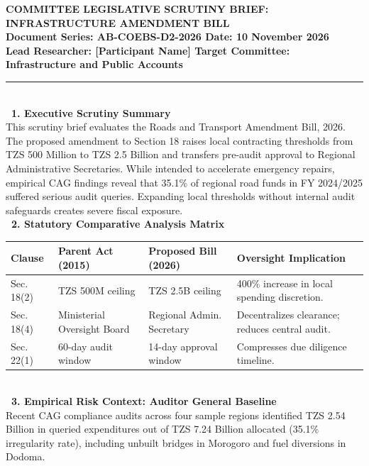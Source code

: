 \documentclass[11pt, a4paper]{report}
\begin{document}
\begin{tcolorbox}[colback=lightgrey, colframe=bordergrey, title=\textbf{Deliverable 2 Preview: \texttt{Day2\_Legislative\_Scrutiny\_Brief.md}}]
\small
\textcolor{tanzaniablue}{\textbf{COMMITTEE LEGISLATIVE SCRUTINY BRIEF: INFRASTRUCTURE AMENDMENT BILL}}\\
\textbf{\textcolor{tanzaniablue}{Document Series:} AB-COEBS-D2-2026 \quad \textbar{} \quad \textcolor{suagreen}{\textbf{Date:}} 10 November 2026}\\
\textbf{\textcolor{tanzaniablue}{Lead Researcher:} [Participant Name] \quad \textbar{} \quad \textcolor{tanzaniablue}{\textbf{Target Committee:}} Infrastructure and Public Accounts}\\[0.2cm]
\rule{\textwidth}{0.4pt}\\[0.2cm]
\textcolor{tanzaniablue}{\textbf{\ 1. Executive Scrutiny Summary}}\\
This scrutiny brief evaluates the Roads and Transport Amendment Bill, 2026. The proposed amendment to Section 18 raises local contracting thresholds from TZS 500 Million to TZS 2.5 Billion and transfers pre-audit approval to Regional Administrative Secretaries. While intended to accelerate emergency repairs, empirical CAG findings reveal that 35.1\% of regional road funds in FY 2024/2025 suffered serious audit queries. Expanding local thresholds without internal audit safeguards creates severe fiscal exposure.\\[0.2cm]
\textcolor{tanzaniablue}{\textbf{\ 2. Statutory Comparative Analysis Matrix}}\\
\begin{tabular}{p{2.2cm}p{3.2cm}p{3.2cm}p{3.8cm}}
\toprule
\textbf{Clause} & \textbf{Parent Act (2015)} & \textbf{Proposed Bill (2026)} & \textbf{Oversight Implication} \\
\midrule
Sec. 18(2) & TZS 500M ceiling & TZS 2.5B ceiling & 400\% increase in local spending discretion. \\
Sec. 18(4) & Ministerial Oversight Board & Regional Admin. Secretary & Decentralizes clearance; reduces central audit. \\
Sec. 22(1) & 60-day audit window & 14-day approval window & Compresses due diligence timeline. \\
\bottomrule
\end{tabular}\\[0.2cm]
\textcolor{tanzaniablue}{\textbf{\ 3. Empirical Risk Context: Auditor General Baseline}}\\
Recent CAG compliance audits across four sample regions identified TZS 2.54 Billion in queried expenditures out of TZS 7.24 Billion allocated (35.1\% irregularity rate), including unbuilt bridges in Morogoro and fuel diversions in Dodoma.\\[0.2cm]

\end{tcolorbox}
\end{document}
